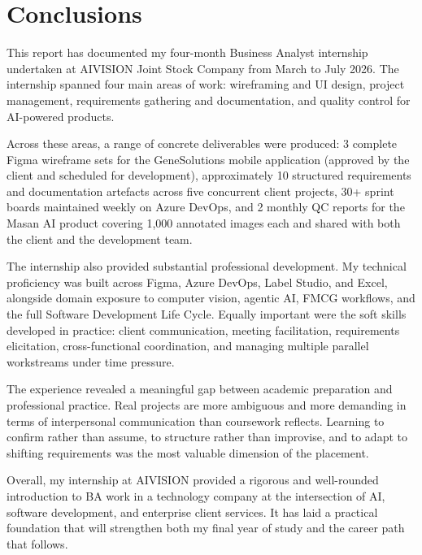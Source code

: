 \chapter{Conclusions}
\label{chap:conclusions}

This report has documented my four-month Business Analyst internship undertaken at AIVISION Joint Stock Company from March to July 2026. The internship spanned four main areas of work: wireframing and UI design, project management, requirements gathering and documentation, and quality control for AI-powered products.

Across these areas, a range of concrete deliverables were produced: 3 complete Figma wireframe sets for the GeneSolutions mobile application (approved by the client and scheduled for development), approximately 10 structured requirements and documentation artefacts across five concurrent client projects, 30+ sprint boards maintained weekly on Azure DevOps, and 2 monthly QC reports for the Masan AI product covering 1,000 annotated images each and shared with both the client and the development team.

The internship also provided substantial professional development. My technical proficiency was built across Figma, Azure DevOps, Label Studio, and Excel, alongside domain exposure to computer vision, agentic AI, FMCG workflows, and the full Software Development Life Cycle. Equally important were the soft skills developed in practice: client communication, meeting facilitation, requirements elicitation, cross-functional coordination, and managing multiple parallel workstreams under time pressure.

The experience revealed a meaningful gap between academic preparation and professional practice. Real projects are more ambiguous and more demanding in terms of interpersonal communication than coursework reflects. Learning to confirm rather than assume, to structure rather than improvise, and to adapt to shifting requirements was the most valuable dimension of the placement.

Overall, my internship at AIVISION provided a rigorous and well-rounded introduction to BA work in a technology company at the intersection of AI, software development, and enterprise client services. It has laid a practical foundation that will strengthen both my final year of study and the career path that follows.
